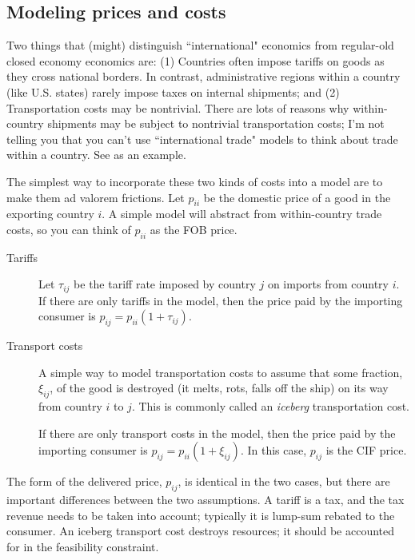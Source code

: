 \documentclass[11pt, pdftex]{article}
\begin{document}
\subsection*{Modeling prices and costs}
Two things that (might) distinguish ``international" economics from regular-old closed economy economics are: (1) Countries often impose tariffs on goods as they cross national borders. In contrast, administrative regions  within a country (like U.S. states) rarely impose taxes on internal shipments; and (2) Transportation costs may be nontrivial.  There are lots of reasons why within-country shipments may be subject to nontrivial transportation costs; I'm not telling you that you can't use ``international trade" models to think about trade within a country.  See \citet{donaldson} as an example.

The simplest way to incorporate these two kinds of costs into a model are to make them ad valorem frictions. Let $p_{ii}$ be the domestic price of a good in the exporting country $i$. A simple model will abstract from within-country trade costs, so you can think of $p_{ii}$ as the FOB price.
\begin{description}
  \item[Tariffs] Let $\tau_{ij}$ be the tariff rate imposed by country $j$ on imports from country $i$. If there are only tariffs in the model, then the price paid by the importing consumer is $p_{ij} = p_{ii} (1+\tau_{ij})$.
  \item[Transport costs] A simple way to model transportation costs to assume that some fraction, $\xi_{ij}$, of the good is destroyed (it melts, rots, falls off the ship) on its way from country $i$ to $j$. This is commonly called an \textit{iceberg} transportation cost.

      If there are only transport costs in the model, then the price paid by the importing consumer is $p_{ij} = p_{ii} (1+\xi_{ij})$.  In this case, $p_{ij}$ is the CIF price.
\end{description}

The form of the delivered price, $p_{ij}$, is identical in the two cases, but there are important differences between the two assumptions.  A tariff is a tax, and the tax revenue needs to be taken into account; typically it is lump-sum rebated to the consumer. An iceberg transport cost destroys resources; it should be accounted for in the feasibility constraint.


\setlength{\parskip}{0.0cm}
\printbibliography
\end{document}
